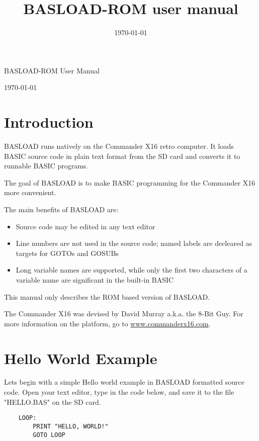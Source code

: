 \documentclass{article}
\title{BASLOAD-ROM user manual}
\date{\today}
\begin{document}
\begin{huge}
    BASLOAD-ROM User Manual
\end{huge}

\vspace{1em}
\today

\vspace{4em}
\tableofcontents
\vspace{4em}

\section{Introduction}

    BASLOAD runs natively on the Commander X16 retro computer. It loads BASIC 
    source code in plain text format from the SD card and converts it to 
    runnable BASIC programs.

    The goal of BASLOAD is to make BASIC programming for the Commander X16 more convenient.

    The main benefits of BASLOAD are:

    \begin{itemize}
        \item Source code may be edited in any text editor
        \item Line numbers are not used in the source code; named labels are 
              decleared as targets for GOTOs and GOSUBs
        \item Long variable names are supported, while only the first two 
              characters of a variable name are significant in the built-in 
              BASIC
    \end{itemize}
    
    This manual only describes the ROM based version of BASLOAD.

    The Commander X16 was devised by David Murray a.k.a. the 
    8-Bit Guy. For more information on the platform, go to 
    \href{http://www.commanderx16.com}{www.commanderx16.com}.

\section{Hello World Example}

    Lets begin with a simple Hello world example in BASLOAD formatted
    source code. Open your text editor, type in the code below, and save it to
    the file "HELLO.BAS" on the SD card.

    \begin{verbatim}
    LOOP:
        PRINT "HELLO, WORLD!"
        GOTO LOOP
    \end{verbatim}
\end{document}
